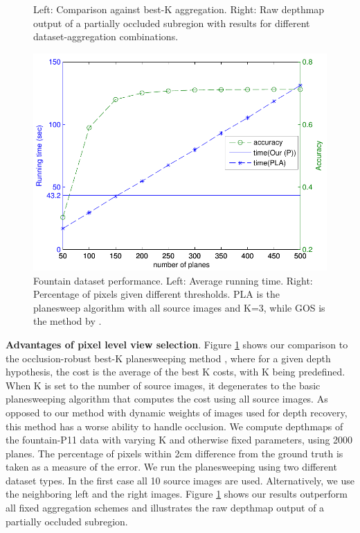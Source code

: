 \begin{figure}[]
\centering
{}
\caption{Left: Comparison against best-K aggregation. Right: Raw depthmap output of a partially occluded subregion with results for different dataset-aggregation combinations.}
\label{fig:bestK}
\end{figure}

\begin{figure}[]
\centering
\includegraphics[width=0.7\linewidth]{chapter3/resource/planesweepTiming.pdf}
\caption{Fountain dataset performance. Left: Average running time. Right: Percentage of pixels given different thresholds.  PLA is the planesweep algorithm with all source images and K=3, while GOS is the method by \citet{Goesele07}.}
\label{fig:timing}
\end{figure}

{\bf Advantages of pixel level view selection}. Figure \ref{fig:bestK} shows our comparison to the occlusion-robust best-K planesweeping method \cite{handle_occlusion2001}, where
for a given depth hypothesis, the cost is the average of the best K costs, with K being predefined.
When K is set to the number of source images, it degenerates to the basic planesweeping algorithm that computes the cost using all source images.
As opposed to our method with dynamic weights of images used for depth recovery, this method has a worse ability to handle occlusion.
We compute depthmaps of the fountain-P11 data with varying K and otherwise fixed parameters, using 2000 planes.
The percentage of pixels within 2cm difference from the ground truth is taken as a measure of the error.
We run the planesweeping using two different dataset types. In the first case all 10 source images are used. Alternatively, we use the neighboring left and the right images.
Figure \ref{fig:bestK} shows our results outperform all fixed aggregation schemes and illustrates the raw depthmap output of a partially occluded subregion.



